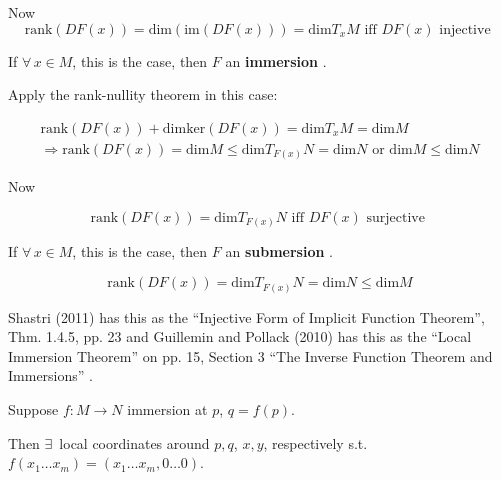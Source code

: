 Now  
\[
\text{rank}(DF(x)) = \text{dim}(\text{im}(DF(x)))  = \text{dim}T_xM \text{ iff } DF(x) \text{ injective }  
\]

If $\forall \, x \in M$, this is the case, then $F$ an \textbf{ immersion }.  

Apply the rank-nullity theorem in this case:  

\[
\begin{gathered}
	\text{rank}(DF(x)) + \text{dim}\text{ker}(DF(x)) = \text{dim}T_xM = \text{dim}M \\ 
	\Longrightarrow \text{rank}(DF(x)) = \text{dim}M \leq \text{dim}T_{F(x)}N = \text{dim}N \text{ or } \text{dim}M \leq \text{dim}N 
\end{gathered}
\]

Now 

\[
\text{rank}(DF(x)) = \text{dim}T_{F(x)}N \text{ iff } DF(x) \text{ surjective }  
\]

If $\forall \, x \in M$, this is the case, then $F$ an \textbf{ submersion }.  

\[
 \text{rank}(DF(x)) = \text{dim}T_{F(x)}N = \text{dim}N  \leq \text{dim}M  
\]

Shastri (2011) has this as the ``Injective Form of Implicit Function Theorem'', Thm. 1.4.5, pp. 23 and Guillemin and Pollack (2010) has this as the ``Local Immersion Theorem'' on pp. 15, Section 3 ``The Inverse Function Theorem and Immersions'' \cite{dgdt:VGuilleminAPollack2010}.  

\begin{theorem}\label{dgdt:Thm:LocalImmersion}
  Suppose $f:M\to N$ immersion at $p$, $q=f(p)$.  

Then $\exists \, $ local coordinates around $p,q$, $x,y$, respectively s.t. $f(x_1\dots x_m) = (x_1 \dots x_m,0 \dots 0)$.  

\end{theorem}

